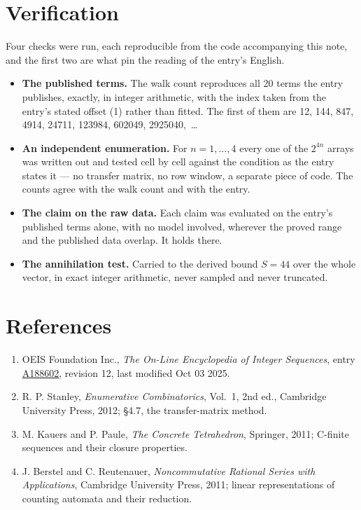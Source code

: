 \documentclass[11pt]{article}
\theoremstyle{definition}
\begin{document}
\section{Verification}

Four checks were run, each reproducible from the code accompanying this note, and the first two are what pin the reading of the entry's English.

\begin{itemize}

\item {\bfseries The published terms.} The walk count reproduces all 20 terms the entry publishes, exactly, in integer arithmetic, with the index taken from the entry's stated offset (1) rather than fitted. The first of them are 12, 144, 847, 4914, 24711, 123984, 602049, 2925040,~\dots

\item {\bfseries An independent enumeration.} For $n = 1,\dots,4$ every one of the $2^{4n}$ arrays was written out and tested cell by cell against the condition as the entry states it --- no transfer matrix, no row window, a separate piece of code. The counts agree with the walk count and with the entry.

\item {\bfseries The claim on the raw data.} Each claim was evaluated on the entry's published terms alone, with no model involved, wherever the proved range and the published data overlap. It holds there.

\item {\bfseries The annihilation test.} Carried to the derived bound $S = 44$ over the whole vector, in exact integer arithmetic, never sampled and never truncated.

\end{itemize}

\section{References}

\begin{enumerate}

\item OEIS Foundation Inc., \emph{The On-Line Encyclopedia of Integer Sequences}, entry \href{https://oeis.org/A188602}{A188602}, revision 12, last modified Oct 03 2025.

\item R. P. Stanley, \emph{Enumerative Combinatorics}, Vol.~1, 2nd ed., Cambridge University Press, 2012; \S4.7, the transfer-matrix method.

\item M. Kauers and P. Paule, \emph{The Concrete Tetrahedron}, Springer, 2011; C-finite sequences and their closure properties.

\item J. Berstel and C. Reutenauer, \emph{Noncommutative Rational Series with Applications}, Cambridge University Press, 2011; linear representations of counting automata and their reduction.

\end{enumerate}
\end{document}
